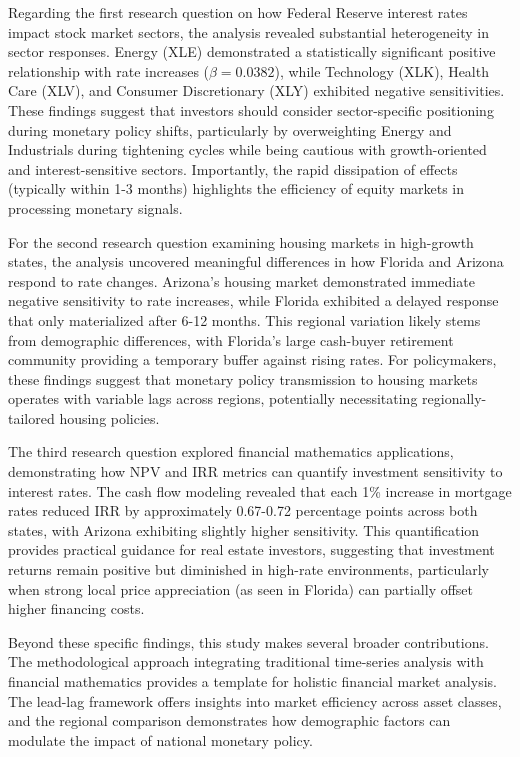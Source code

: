 \documentclass[12pt, stu, abstract]{apa7}
\begin{document}
Regarding the first research question on how Federal Reserve interest rates impact stock market sectors, the analysis revealed substantial heterogeneity in sector responses. Energy (XLE) demonstrated a statistically significant positive relationship with rate increases ($\beta = 0.0382$), while Technology (XLK), Health Care (XLV), and Consumer Discretionary (XLY) exhibited negative sensitivities. These findings suggest that investors should consider sector-specific positioning during monetary policy shifts, particularly by overweighting Energy and Industrials during tightening cycles while being cautious with growth-oriented and interest-sensitive sectors. Importantly, the rapid dissipation of effects (typically within 1-3 months) highlights the efficiency of equity markets in processing monetary signals.

For the second research question examining housing markets in high-growth states, the analysis uncovered meaningful differences in how Florida and Arizona respond to rate changes. Arizona's housing market demonstrated immediate negative sensitivity to rate increases, while Florida exhibited a delayed response that only materialized after 6-12 months. This regional variation likely stems from demographic differences, with Florida's large cash-buyer retirement community providing a temporary buffer against rising rates. For policymakers, these findings suggest that monetary policy transmission to housing markets operates with variable lags across regions, potentially necessitating regionally-tailored housing policies.

The third research question explored financial mathematics applications, demonstrating how NPV and IRR metrics can quantify investment sensitivity to interest rates. The cash flow modeling revealed that each 1\% increase in mortgage rates reduced IRR by approximately 0.67-0.72 percentage points across both states, with Arizona exhibiting slightly higher sensitivity. This quantification provides practical guidance for real estate investors, suggesting that investment returns remain positive but diminished in high-rate environments, particularly when strong local price appreciation (as seen in Florida) can partially offset higher financing costs.

Beyond these specific findings, this study makes several broader contributions. The methodological approach integrating traditional time-series analysis with financial mathematics provides a template for holistic financial market analysis. The lead-lag framework offers insights into market efficiency across asset classes, and the regional comparison demonstrates how demographic factors can modulate the impact of national monetary policy.
\end{document}
